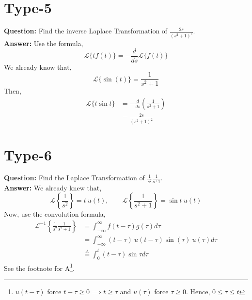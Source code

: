 \section{Type-5}

\textbf{Question:} Find the inverse Laplace Transformation of $\frac{2s}{(s^2+1)^2}$.\\
\textbf{Answer:} Use the formula, $$\mathcal{L}\{t f(t)\}=-\frac{d}{ds}\mathcal{L}\{f(t)\}$$
We already know that, $$\mathcal{L}\{\sin (t)\}=\frac{1}{s^2+1}$$
Then, 
\begin{align*}
    \mathcal{L}\{t\sin{t}\}&= -\frac{d}{ds}\left( \frac{1}{s^2+1} \right)\\
    &= \frac{2s}{(s^2+1)^2}
\end{align*}
\section{Type-6}
\textbf{Question:} Find the Laplace Transformation of $\frac{1}{s^2}\frac{1}{s^+1}$.\\ 
\textbf{Answer:} We already knew that, $$\mathcal{L}\left\{\frac{1}{s^2}\right\}= t\:u(t), \qquad\mathcal{L}\left\{\frac{1}{s^2+1}\right\}=\sin{t}\: u(t)$$
Now, use the convolution formula, 
\begin{align*}
    \mathcal{L}^{-1}\left\{\frac{1}{s^2}\frac{1}{s^2+1}\right\}&= \int_{-\infty}^\infty f(t-\tau)g(\tau)d\tau\\
    &= \int_{-\infty}^\infty (t-\tau)\: u(t-\tau) \sin(\tau)\: u(\tau) d\tau\\
    &\stackrel{A}{=} \int_0^t (t-\tau) \sin{\tau} d\tau 
\end{align*}
See the footnote for A\footnote{$u(t-\tau)$ force $t-\tau\geq 0\implies t\geq \tau$ and $u(\tau)$ force $\tau\geq 0$. Hence, $0\leq\tau\leq t$}. 